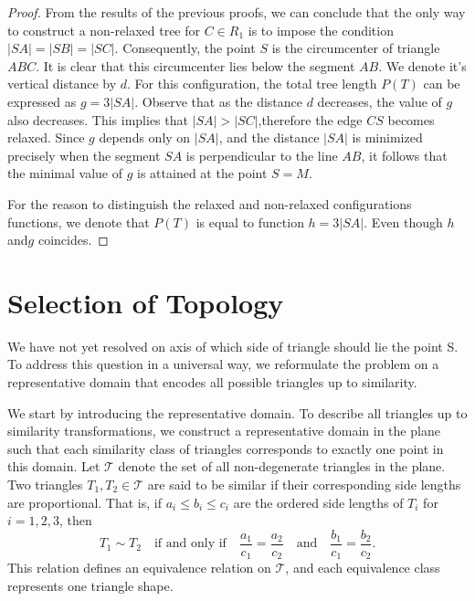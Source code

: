 \documentclass[openany]{book}
\newcommand{\Ptotal}[1]{P(#1)}
\begin{document}
	\begin{proof}
	From the results of the previous proofs, we can conclude that the only way to construct a non-relaxed tree for \( C \in R_1 \) is to impose the condition \(|SA| = |SB| = |SC|.\) Consequently, the point \( S \) is the circumcenter of triangle \( ABC \). It is clear that this circumcenter lies below the segment \( AB \). We denote it's vertical distance by \( d \).	For this configuration, the total tree length \(P(T)\) can be expressed as \(g=3|SA|\). Observe that as the distance \(d\) decreases, the value of \(g\) also decreases. This implies that \(|SA|>|SC|\),therefore the edge \(CS\) becomes relaxed.
	Since \(g\) depends only on \(|SA|\), and the distance \(|SA|\) is minimized precisely when the segment \(SA\) is perpendicular to the line \(AB\), it follows that the minimal value of \(g\) is attained at the point \(S=M\).
	
	For the reason to distinguish the relaxed and non-relaxed configurations functions, we denote that \(\Ptotal{T}\) is equal to function \(h=3|SA|\). Even though \(h\)and\(g\) coincides.
	\end{proof}
	
	\section{Selection of Topology}
	
	We have not yet resolved on axis of which side of triangle should lie the point S. To address this question in a universal way, we reformulate the problem on a representative domain that encodes all possible triangles up to similarity.

	We start by introducing the representative domain. To describe all triangles up to similarity transformations, we construct a representative domain in the plane such that each similarity class of triangles corresponds to exactly one point in this domain.
	Let $\mathcal{T}$ denote the set of all non-degenerate triangles in the plane. 
	Two triangles $T_1, T_2 \in \mathcal{T}$ are said to be similar if their corresponding 
	side lengths are proportional. That is, if $a_i \le b_i \le c_i$ are the ordered 
	side lengths of $T_i$ for $i = 1,2,3$, then
	\[
	T_1 \sim T_2 
	\quad \text{if and only if} \quad
	\frac{a_1}{c_1} = \frac{a_2}{c_2}
	\quad \text{and} \quad
	\frac{b_1}{c_1} = \frac{b_2}{c_2}.
	\]
	This relation defines an equivalence relation on $\mathcal{T}$, and each 
	equivalence class represents one triangle shape.
	
\end{document}
